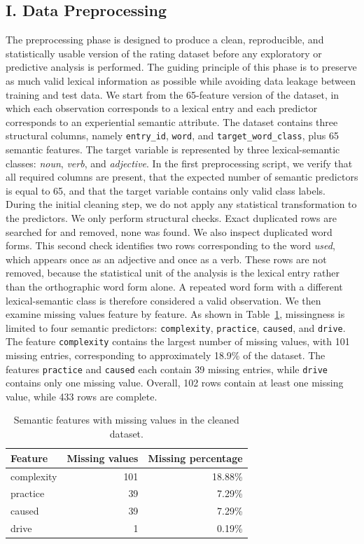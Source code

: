 \documentclass{ipgpmaster}
\begin{document}
\subsection{I. Data Preprocessing}
\label{subsec}
The preprocessing phase is designed to produce a clean, reproducible, and statistically usable version of the rating dataset before any exploratory or predictive analysis is performed. The guiding principle of this phase is to preserve as much valid lexical information as possible while avoiding data leakage between training and test data.
We start from the 65-feature version of the dataset, in which each observation corresponds to a lexical entry and each predictor corresponds to an experiential semantic attribute. The dataset contains three structural columns, namely \texttt{entry\_id}, \texttt{word}, and \texttt{target\_word\_class}, plus 65 semantic features. The target variable is represented by three lexical-semantic classes: \emph{noun}, \emph{verb}, and \emph{adjective}. In the first preprocessing script, we verify that all required columns are present, that the expected number of semantic predictors is equal to 65, and that the target variable contains only valid class labels.
During the initial cleaning step, we do not apply any statistical transformation to the predictors. We only perform structural checks. Exact duplicated rows are searched for and removed, none was found. We also inspect duplicated word forms. This second check identifies two rows corresponding to the word \emph{used}, which appears once as an adjective and once as a verb. These rows are not removed, because the statistical unit of the analysis is the lexical entry rather than the orthographic word form alone. A repeated word form with a different lexical-semantic class is therefore considered a valid observation. We then examine missing values feature by feature. As shown in Table~\ref{tab:missing_values_preprocessing}, missingness is limited to four semantic predictors: \texttt{complexity}, \texttt{practice}, \texttt{caused}, and \texttt{drive}. The feature \texttt{complexity} contains the largest number of missing values, with 101 missing entries, corresponding to approximately 18.9\% of the dataset. The features \texttt{practice} and \texttt{caused} each contain 39 missing entries, while \texttt{drive} contains only one missing value. Overall, 102 rows contain at least one missing value, while 433 rows are complete.
\begin{table}[H]
\centering
\begin{tabular}{lrr}
\toprule
\textbf{Feature} & \textbf{Missing values} & \textbf{Missing percentage} \\
\midrule
complexity & 101 & 18.88\% \\
practice & 39 & 7.29\% \\
caused & 39 & 7.29\% \\
drive & 1 & 0.19\% \\
\bottomrule
\end{tabular}
\caption{Semantic features with missing values in the cleaned dataset.}
\label{tab:missing_values_preprocessing}
\end{table}
\end{document}
